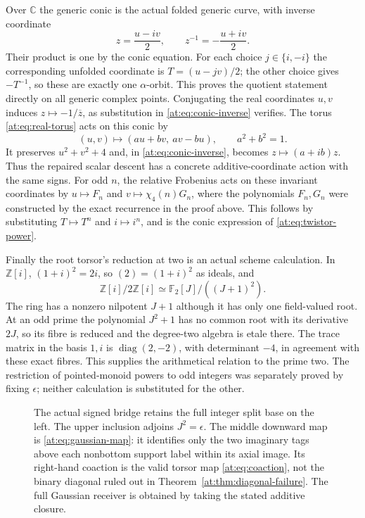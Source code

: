 \documentclass[11pt,a4paper]{article}
\theoremstyle{definition}\newtheorem{definition}[theorem]{Definition}
\newcommand{\Z}{\mathbb Z}\newcommand{\Q}{\mathbb Q}
\newcommand{\C}{\mathbb C}\newcommand{\R}{\mathbb R}
\begin{document}
Over $\C$ the generic conic is the actual folded generic curve,
with inverse coordinate
\[
 z=\frac{u-iv}{2},\qquad z^{-1}=-\frac{u+iv}{2}.
 \tag{AT29a}\label{at:eq:conic-inverse}
\]
Their product is one by the conic equation. For each choice
$j\in\{i,-i\}$ the corresponding unfolded coordinate is
$T=(u-jv)/2$; the other choice gives $-T^{-1}$, so these are
exactly one $\alpha$-orbit. This proves the quotient statement
directly on all generic complex points. Conjugating the real
coordinates $u,v$ induces $z\mapsto-1/\overline z$, as
substitution in \eqref{at:eq:conic-inverse} verifies.
The torus \eqref{at:eq:real-torus} acts on this conic by
\[
 (u,v)\longmapsto(au+bv,\ av-bu),\qquad a^2+b^2=1.
 \tag{AT29b}\label{at:eq:conic-action}
\]
It preserves $u^2+v^2+4$ and, in \eqref{at:eq:conic-inverse},
becomes $z\mapsto(a+ib)z$. Thus the repaired scalar descent
has a concrete additive-coordinate action with the same signs.
For odd $n$, the relative Frobenius acts on these invariant
coordinates by $u\mapsto F_n$ and
$v\mapsto\chi_4(n)G_n$, where the polynomials $F_n,G_n$
were constructed by the exact recurrence in the proof above.
This follows by substituting $T\mapsto T^n$ and $i\mapsto i^n$,
and is the conic expression of \eqref{at:eq:twistor-power}.

Finally the root torsor's reduction at two is an actual scheme
calculation. In $\Z[i]$,
$(1+i)^2=2i$, so $(2)=(1+i)^2$ as ideals, and
\[
 \Z[i]/2\Z[i]\simeq\mathbb F_2[J]/((J+1)^2).
 \tag{AT30}\label{at:eq:two-fibre}
\]
The ring has a nonzero nilpotent $J+1$ although it has only one
field-valued root. At an odd prime the polynomial $J^2+1$ has
no common root with its derivative $2J$, so its fibre is reduced
and the degree-two algebra is etale there. The trace matrix in
the basis $1,i$ is $\operatorname{diag}(2,-2)$, with determinant
$-4$, in agreement with these exact fibres. This supplies the
arithmetical relation to the prime two. The restriction of
pointed-monoid powers to odd integers was separately proved by
fixing $\epsilon$; neither calculation is substituted for the
other.

\begin{figure}[ht]
\centering
{}
\caption{The actual signed bridge retains the full integer split
base on the left. The upper inclusion adjoins $J^2=\epsilon$.
The middle downward map is \eqref{at:eq:gaussian-map}: it identifies
only the two imaginary tags above each nonbottom support label
within its axial image. Its right-hand coaction is the valid
torsor map \eqref{at:eq:coaction}, not the binary diagonal ruled
out in Theorem~\ref{at:thm:diagonal-failure}. The full Gaussian
receiver is obtained by taking the stated additive closure.}
\end{figure}
\end{document}
